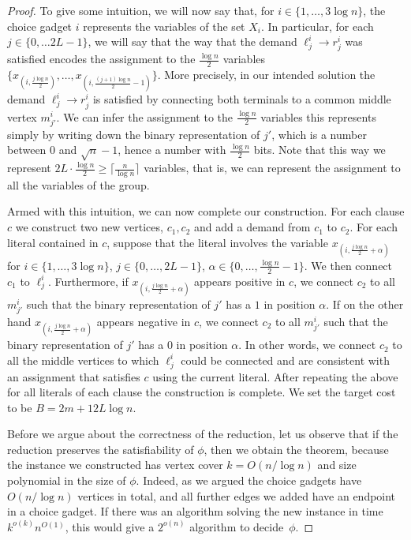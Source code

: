 \begin{proof}
To give some intuition, we will now say that, for $i\in\{1,\ldots, 3\log n\}$,
the choice gadget $i$ represents the variables of the set $X_i$. In particular,
for each $j\in\{0,\ldots 2L-1\}$, we will say that the way that the demand
$\ell^i_j\to r^i_j$ was satisfied encodes the assignment to the $\frac{\log
n}{2}$ variables $\{x_{(i,\frac{j\log n}{2})},\ldots,x_{(i,\frac{(j+1)\log
n}{2}-1)}\}$. More precisely, in our intended solution the demand $\ell^i_j\to
r^i_j$ is satisfied by connecting both terminals to a common middle vertex
$m^i_{j'}$. We can infer the assignment to the $\frac{\log n}{2}$ variables
this represents simply by writing down the binary representation of $j'$, which
is a number between $0$ and $\sqrt{n}-1$, hence a number with $\frac{\log
n}{2}$ bits. Note that this way we represent $2L \cdot \frac{\log n}{2}\ge
\lceil\frac{n}{\log n}\rceil$ variables, that is, we can represent the
assignment to all the variables of the group.

Armed with this intuition, we can now complete our construction. For each
clause $c$ we construct two new vertices, $c_1,c_2$ and add a demand from $c_1$
to $c_2$.  For each literal contained in $c$, suppose that the literal involves
the variable $x_{(i,\frac{j\log n}{2}+\alpha)}$ for $i\in\{1,\ldots,3\log n\}$,
$j\in \{0,\ldots,2L-1\}$, $\alpha\in\{0,\ldots,\frac{\log n}{2}-1\}$. We then
connect $c_1$ to $\ell^i_j$. Furthermore, if $x_{(i,\frac{j\log n}{2}+\alpha)}$
appears positive in $c$, we connect $c_2$ to all $m^i_{j'}$ such that the
binary representation of $j'$ has a $1$ in position $\alpha$. If on the other
hand $x_{(i,\frac{j\log n}{2}+\alpha)}$ appears negative in $c$, we connect
$c_2$ to all $m^i_{j'}$ such that the binary representation of $j'$ has a $0$
in position $\alpha$. In other words, we connect $c_2$ to all the middle
vertices to which $\ell^i_j$ could be connected and are consistent with an
assignment that satisfies $c$ using the current literal. After repeating the
above for all literals of each clause the construction is complete. We set the
target cost to be $B=2m+12L\log n$.

Before we argue about the correctness of the reduction, let us observe that if
the reduction preserves the satisfiability of $\phi$, then we obtain the
theorem, because the instance we constructed has vertex cover $k=O(n/\log n)$
and size polynomial in the size of $\phi$.  Indeed, as we argued the choice
gadgets have $O(n/\log n)$ vertices in total, and all further edges we added
have an endpoint in a choice gadget. If there was an algorithm solving the new
instance in time $k^{o(k)}n^{O(1)}$, this would give a $2^{o(n)}$ algorithm to
decide~$\phi$.


\end{proof}
